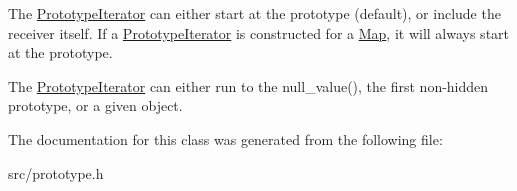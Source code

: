 The \hyperlink{classv8_1_1internal_1_1_prototype_iterator}{Prototype\+Iterator} can either start at the prototype (default), or include the receiver itself. If a \hyperlink{classv8_1_1internal_1_1_prototype_iterator}{Prototype\+Iterator} is constructed for a \hyperlink{classv8_1_1internal_1_1_map}{Map}, it will always start at the prototype.

The \hyperlink{classv8_1_1internal_1_1_prototype_iterator}{Prototype\+Iterator} can either run to the null\+\_\+value(), the first non-\/hidden prototype, or a given object. 

The documentation for this class was generated from the following file\+:\begin{DoxyCompactItemize}
\item 
src/prototype.\+h\end{DoxyCompactItemize}
